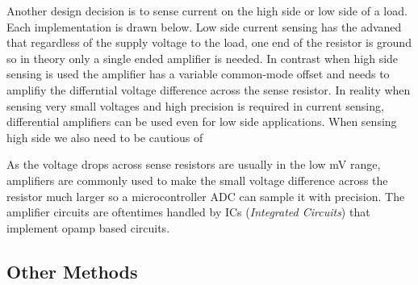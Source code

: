 \documentclass[main.tex]{subfiles}
\begin{document}
Another design decision is to sense current on the high side or low side of a load. Each implementation is drawn below.
Low side current sensing has the advaned that regardless of the supply voltage to the load, one end of the resistor is ground so in theory only a single ended amplifier is needed. In contrast when high side sensing is used the amplifier has a variable common-mode offset and needs to amplifiy the differntial voltage difference across the sense resistor. In reality when sensing very small voltages and high precision is required in current sensing, differential amplifiers can be used even for low side applications. When sensing high side we also need to be cautious of 

As the voltage drops across sense resistors are usually in the low mV range, amplifiers are commonly used to make the small voltage difference across the resistor much larger so a microcontroller ADC can sample it with precision. The amplifier circuits are oftentimes handled by ICs (\textit{Integrated Circuits}) that implement opamp based circuits. 


\subsection{Other Methods}
\end{document}
